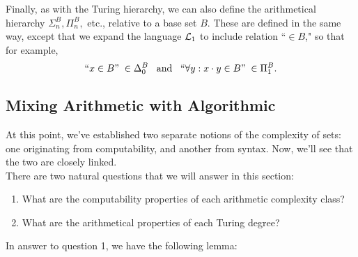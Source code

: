 \documentclass{amsart}
\begin{document}
	Finally, as with the Turing hierarchy, we can also define the arithmetical hierarchy $\Sigma_n^B,\Pi_n^B,$ etc., relative to a base set $B$. These are defined in the same way, except that we expand the language $\mathcal{L}_1$ to include relation ``$\in B$," so that for example, 
	$$``x\in B" \; \in \Delta_0^B \;\;\; \text{and} \;\;\; ``\forall y: x\cdot y \in B" \; \in \Pi_1^B.$$
	
	\subsection{Mixing Arithmetic with Algorithmic}
	
	At this point, we've established two separate notions of the complexity of sets: one originating from computability, and another from syntax. Now, we'll see that the two are closely linked.\\
	
	There are two natural questions that we will answer in this section: 
	\begin{enumerate}[label=\arabic*]
		\item What are the computability properties of each arithmetic complexity class?
		\item What are the arithmetical properties of each Turing degree?
	\end{enumerate}
	In answer to question 1, we have the following lemma:\\
	
\end{document}
